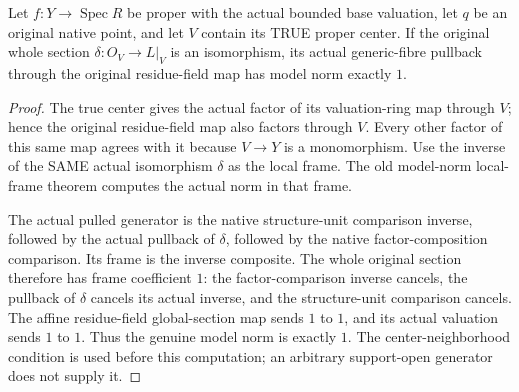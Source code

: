 \begin{lemma}
\label{lem:gauss-central-line-true-center-generator-unit-norm}
\leanok
Let $f:Y\to\operatorname{Spec}R$ be proper with the actual bounded base
valuation, let $q$ be an original native point, and let $V$ contain its
TRUE proper center. If the original whole section
$\delta:O_V\to L|_V$ is an isomorphism, its actual generic-fibre pullback
through the original residue-field map has model norm exactly $1$.
\end{lemma}
\begin{proof}
The true center gives the actual factor of its valua\-tion-ring map
through $V$; hence the original residue-field map also factors through
$V$. Every other factor of this same map agrees with it because $V\to Y$
is a monomorphism. Use the inverse of the SAME actual isomorphism
$\delta$ as the local frame. The old model-norm local-frame theorem
computes the actual norm in that frame.

The actual pulled generator is the native structure-unit comparison
inverse, followed by the actual pullback of $\delta$, followed by the
native factor-composition comparison. Its frame is the inverse composite.
The whole original section therefore has frame coefficient $1$: the
factor-comparison inverse cancels, the pullback of $\delta$ cancels its
actual inverse, and the structure-unit comparison cancels. The affine
residue-field global-section map sends $1$ to $1$, and its actual
valuation sends $1$ to $1$. Thus the genuine model norm is exactly $1$.
The center-neighborhood condition is used before this computation; an
arbitrary support-open generator does not supply it.
\end{proof}

